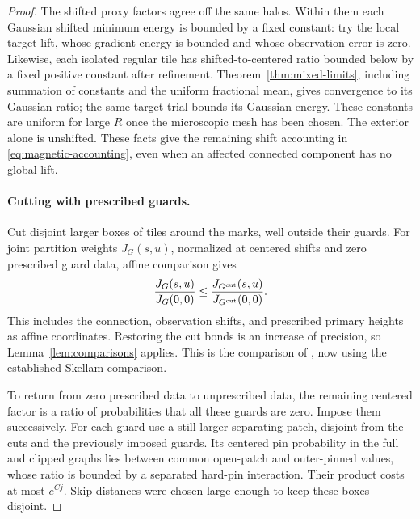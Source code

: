 \begin{proof}
The shifted proxy factors agree off the same halos. Within them
each Gaussian shifted minimum energy is bounded by a fixed
constant: try the local target lift, whose gradient energy is
bounded and whose observation error is zero. Likewise, each
isolated regular tile has shifted-to-centered ratio bounded
below by a fixed positive constant after refinement.
Theorem~\ref{thm:mixed-limits}, including summation of constants
and the uniform fractional mean, gives convergence to its
Gaussian ratio; the same target trial bounds its Gaussian energy.
These constants are uniform for large \(R\) once the microscopic
mesh has been chosen. The exterior alone is unshifted.
These facts give the remaining shift accounting in
\eqref{eq:magnetic-accounting}, even when an affected connected
component has no global lift.

\paragraph{Cutting with prescribed guards.}
Cut disjoint larger boxes of tiles around the marks, well outside
their guards. For joint partition weights \(J_G(s,u)\), normalized
at centered shifts and zero prescribed guard data, affine
comparison gives
\begin{equation}\label{eq:magnetic-guard-cut}
 \frac{J_G(s,u)}{J_G(0,0)}
       \le
 \frac{J_{G^{\rm cut}}(s,u)}{J_{G^{\rm cut}}(0,0)}.
\end{equation}
This includes the connection, observation shifts, and prescribed
primary heights as affine coordinates. Restoring the cut bonds
is an increase of precision, so Lemma~\ref{lem:comparisons}
applies. This is the comparison of , now
using the established Skellam comparison.

To return from zero prescribed data to unprescribed data, the
remaining centered factor is a ratio of probabilities that all
these guards are zero. Impose them successively. For each guard
use a still larger separating patch, disjoint from the cuts and
the previously imposed guards. Its centered pin probability in
the full and clipped graphs lies between common open-patch and
outer-pinned values, whose ratio is bounded by a separated
hard-pin interaction. Their product costs at most \(e^{Cj}\).
Skip distances were chosen large enough to keep these boxes
disjoint.


\end{proof}
